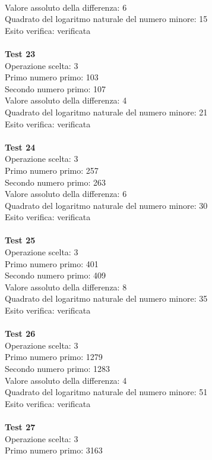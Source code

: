 \documentclass[10pt]{report}
\begin{document}
\\Valore assoluto della differenza: 6
\\Quadrato del logaritmo naturale del numero minore: 15
\\Esito verifica: verificata
\\
\\\textbf{Test 23} 
\\Operazione scelta: 3
\\Primo numero primo: 103
\\Secondo numero primo: 107
\\Valore assoluto della differenza: 4
\\Quadrato del logaritmo naturale del numero minore: 21
\\Esito verifica: verificata
\\
\\\textbf{Test 24} 
\\Operazione scelta: 3
\\Primo numero primo: 257
\\Secondo numero primo: 263
\\Valore assoluto della differenza: 6
\\Quadrato del logaritmo naturale del numero minore: 30
\\Esito verifica: verificata
\\
\\\textbf{Test 25} 
\\Operazione scelta: 3
\\Primo numero primo: 401
\\Secondo numero primo: 409
\\Valore assoluto della differenza: 8
\\Quadrato del logaritmo naturale del numero minore: 35
\\Esito verifica: verificata
\\
\\\textbf{Test 26} 
\\Operazione scelta: 3
\\Primo numero primo: 1279
\\Secondo numero primo: 1283
\\Valore assoluto della differenza: 4
\\Quadrato del logaritmo naturale del numero minore: 51
\\Esito verifica: verificata
\\
\\\textbf{Test 27} 
\\Operazione scelta: 3
\\Primo numero primo: 3163
\end{document}
